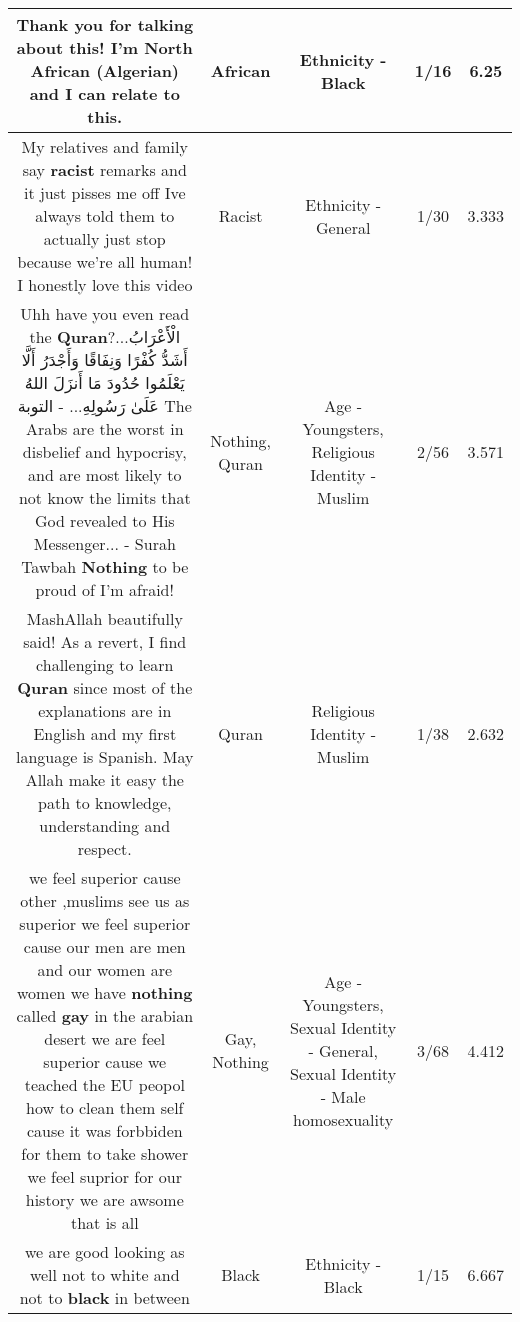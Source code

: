\documentclass[11pt]{article}
\newlength\mylength
\begin{document}
\begin{center}
\begin{longtable}{|C{.65\mylength}|C{.30\mylength}|C{.12\mylength}|C{.12\mylength}|C{.12\mylength}|}
  \small Thank you for talking about this! I'm North \textbf{African} (Algerian) and I can relate to this.\normalsize   & African & Ethnicity - Black & 1/16 & 6.25 \\  \hline
  \small My relatives and family say \textbf{racist} remarks and it just pisses me off Ive always told them to actually just stop because we're all human! I honestly love this video\normalsize   & Racist & Ethnicity - General & 1/30 & 3.333 \\  \hline
  \small Uhh have you even read the \textbf{Quran}?...الْأَعْرَابُ أَشَدُّ كُفْرًا وَنِفَاقًا وَأَجْدَرُ أَلَّا يَعْلَمُوا حُدُودَ مَا أَنزَلَ اللهُ عَلَىٰ رَسُولِهِ... - التوبة The Arabs are the worst in disbelief and hypocrisy, and are most likely to not know the limits that God revealed to His Messenger... - Surah Tawbah \textbf{Nothing} to be proud of I'm afraid!\normalsize   & Nothing, Quran & Age - Youngsters, Religious Identity - Muslim & 2/56 & 3.571 \\  \hline
  \small MashAllah beautifully said! As a revert, I find challenging to learn \textbf{Quran} since most of the explanations are in English and my  first language is Spanish. May Allah make it easy the path to knowledge, understanding and respect.\normalsize   & Quran & Religious Identity - Muslim & 1/38 & 2.632 \\  \hline
  \small we feel superior cause other ,muslims see us as superior we feel superior cause our men are men and our women are women we have \textbf{nothing} called \textbf{g\textbf{ay}} in the arabian desert we are feel superior cause we teached the EU peopol how to clean them self cause it was forbbiden for them to take shower we feel suprior for our history we are awsome that is all\normalsize   & Gay, Nothing & Age - Youngsters, Sexual Identity - General, Sexual Identity - Male homosexuality & 3/68 & 4.412 \\  \hline
  \small we are good looking as well not to white and not to \textbf{black} in between\normalsize   & Black & Ethnicity - Black & 1/15 & 6.667 \\  \hline

\end{longtable}
\end{center}
\end{document}
